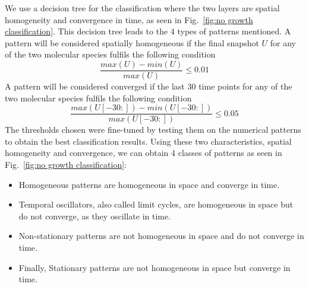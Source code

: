 We use a decision tree for the classification where the two layers are spatial homogeneity and convergence in time, as seen in Fig.~\ref{fig:no growth classification}.
This decision tree leads to the 4 types of patterns mentioned.
A pattern will be considered spatially homogeneous if the final snapshot $U$ for any of the two molecular species fulfils the following condition
\begin{equation}
    \frac{max(U) - min(U)}{max(U)} \leq 0.01
\end{equation}
A pattern will be considered converged if the last 30 time points for any of the two molecular species fulfils the following condition
\begin{equation}
    \frac{max(U[-30:]) - min(U[-30:])}{max(U[-30:])} \leq 0.05
\end{equation}
The thresholds chosen were fine-tuned by testing them on the numerical patterns to obtain the best classification results.
Using these two characteristics, spatial homogeneity and convergence, we can obtain 4 classes of patterns as seen in Fig.~\ref{fig:no growth classification}:
\begin{itemize}
    \item Homogeneous patterns are homogeneous in space and converge in time.
    \item Temporal oscillators, also called limit cycles, are homogeneous in space but do not converge, as they oscillate in time.
    \item Non-stationary patterns are not homogeneous in space and do not converge in time.
    \item Finally, Stationary patterns are not homogeneous in space but converge in time.
\end{itemize}

